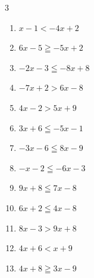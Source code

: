 \begin{multicols}{3}
\begin{enumerate}

  \item $x-1<-4x+2$


  \item $6x-5\geqq -5x+2$


  \item $-2x-3\leqq -8x+8$


  \item $-7x+2>6x-8$


  \item $4x-2>5x+9$

        \phantom{$\displaystyle x<-11$}

  \item $3x+6\leqq -5x-1$


  \item $-3x-6\leqq 8x-9$


  \item $-x-2\leqq -6x-3$


\columnbreak %

  \item $9x+8\leqq 7x-8$

        \phantom{$\displaystyle x\leqq -8$}

  \item $6x+2\leqq 4x-8$

        \phantom{$\displaystyle x\leqq -5$}

  \item $8x-3>9x+8$

        \phantom{$\displaystyle x<-11$}

  \item $4x+6<x+9$

        \phantom{$\displaystyle x<1$}

  \item $4x+8\geqq 3x-9$

        \phantom{$\displaystyle x\geqq -17$}


\end{enumerate}
\end{multicols}
